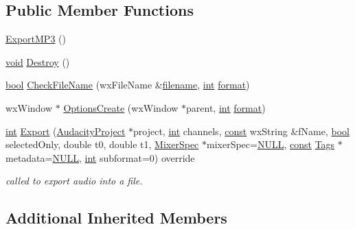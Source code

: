 \subsection*{Public Member Functions}
\begin{DoxyCompactItemize}
\item 
\hyperlink{class_export_m_p3_a6064a1c4f2020740813f632310387f06}{Export\+M\+P3} ()
\item 
\hyperlink{sound_8c_ae35f5844602719cf66324f4de2a658b3}{void} \hyperlink{class_export_m_p3_a8d2d944ddd4d17ddcc6b641f5bc8995e}{Destroy} ()
\item 
\hyperlink{mac_2config_2i386_2lib-src_2libsoxr_2soxr-config_8h_abb452686968e48b67397da5f97445f5b}{bool} \hyperlink{class_export_m_p3_a858e259f7128493def1f2b74ec38274e}{Check\+File\+Name} (wx\+File\+Name \&\hyperlink{test__portburn_8cpp_a7efa5e9c7494c7d4586359300221aa5d}{filename}, \hyperlink{xmltok_8h_a5a0d4a5641ce434f1d23533f2b2e6653}{int} \hyperlink{_export_p_c_m_8cpp_a317afff57d87a89158c2b038d37b2b08}{format})
\item 
wx\+Window $\ast$ \hyperlink{class_export_m_p3_a991ae36b994fe9eeed659af1f5a00ef4}{Options\+Create} (wx\+Window $\ast$parent, \hyperlink{xmltok_8h_a5a0d4a5641ce434f1d23533f2b2e6653}{int} \hyperlink{_export_p_c_m_8cpp_a317afff57d87a89158c2b038d37b2b08}{format})
\item 
\hyperlink{xmltok_8h_a5a0d4a5641ce434f1d23533f2b2e6653}{int} \hyperlink{class_export_m_p3_a68e40c29eeccc56625cb91d729763688}{Export} (\hyperlink{class_audacity_project}{Audacity\+Project} $\ast$project, \hyperlink{xmltok_8h_a5a0d4a5641ce434f1d23533f2b2e6653}{int} channels, \hyperlink{getopt1_8c_a2c212835823e3c54a8ab6d95c652660e}{const} wx\+String \&f\+Name, \hyperlink{mac_2config_2i386_2lib-src_2libsoxr_2soxr-config_8h_abb452686968e48b67397da5f97445f5b}{bool} selected\+Only, double t0, double t1, \hyperlink{class_mixer_spec}{Mixer\+Spec} $\ast$mixer\+Spec=\hyperlink{px__mixer_8h_a070d2ce7b6bb7e5c05602aa8c308d0c4}{N\+U\+LL}, \hyperlink{getopt1_8c_a2c212835823e3c54a8ab6d95c652660e}{const} \hyperlink{class_tags}{Tags} $\ast$metadata=\hyperlink{px__mixer_8h_a070d2ce7b6bb7e5c05602aa8c308d0c4}{N\+U\+LL}, \hyperlink{xmltok_8h_a5a0d4a5641ce434f1d23533f2b2e6653}{int} subformat=0) override
\begin{DoxyCompactList}\small\item\em called to export audio into a file. \end{DoxyCompactList}\end{DoxyCompactItemize}
\subsection*{Additional Inherited Members}



